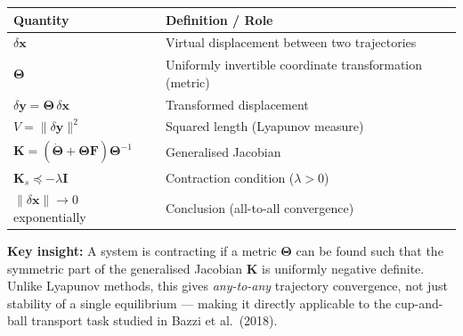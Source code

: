 \documentclass[11pt,a4paper]{article}
\begin{document}
\begin{center}
\small
\begin{tabular}{@{}ll@{}}
\toprule
\textbf{Quantity} & \textbf{Definition / Role} \\
\midrule
$\delta\bm{x}$ & Virtual displacement between two trajectories \\
$\bm{\Theta}$ & Uniformly invertible coordinate transformation (metric) \\
$\delta\bm{y} = \bm{\Theta}\,\delta\bm{x}$ & Transformed displacement \\
$V = \|\delta\bm{y}\|^2$ & Squared length (Lyapunov measure) \\
$\bm{K} = (\dot{\bm{\Theta}}+\bm{\Theta}\bm{F})\bm{\Theta}^{-1}$ & Generalised Jacobian \\
$\bm{K}_s \preceq -\lambda\bm{I}$ & Contraction condition ($\lambda>0$) \\
$\|\delta\bm{x}\|\to0$ exponentially & Conclusion (all-to-all convergence) \\
\bottomrule
\end{tabular}
\end{center}

\vspace{6pt}
\noindent
\textbf{Key insight:} A system is contracting if a metric $\bm{\Theta}$ can be
found such that the symmetric part of the generalised Jacobian $\bm{K}$ is
uniformly negative definite.  Unlike Lyapunov methods, this gives
\emph{any-to-any} trajectory convergence, not just stability of a single
equilibrium --- making it directly applicable to the cup-and-ball transport task
studied in Bazzi et al.\ (2018).
\end{document}
